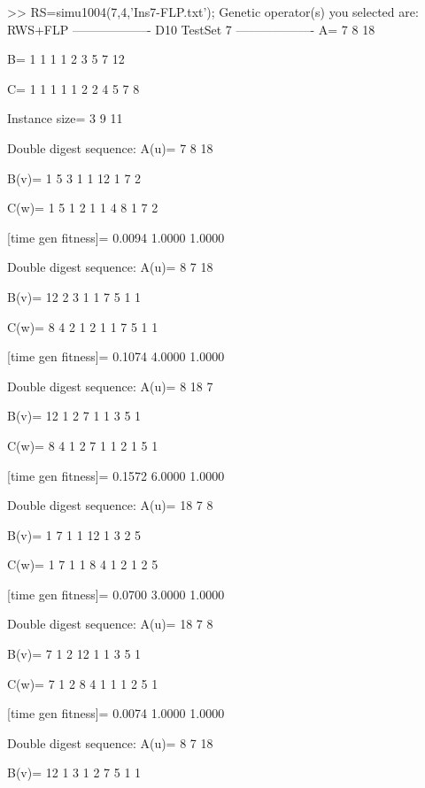 >> RS=simu1004(7,4,'Ins7-FLP.txt');
Genetic operator(s) you selected are:
RWS+FLP
------------------- D10 TestSet 7 -------------------
A=
     7     8    18

B=
     1     1     1     1     2     3     5     7    12

C=
     1     1     1     1     1     2     2     4     5     7     8

Instance size=
     3     9    11

Double digest sequence:
A(u)=
     7     8    18

B(v)=
     1     5     3     1     1    12     1     7     2

C(w)=
     1     5     1     2     1     1     4     8     1     7     2

[time gen fitness]=
    0.0094    1.0000    1.0000

Double digest sequence:
A(u)=
     8     7    18

B(v)=
    12     2     3     1     1     7     5     1     1

C(w)=
     8     4     2     1     2     1     1     7     5     1     1

[time gen fitness]=
    0.1074    4.0000    1.0000

Double digest sequence:
A(u)=
     8    18     7

B(v)=
    12     1     2     7     1     1     3     5     1

C(w)=
     8     4     1     2     7     1     1     2     1     5     1

[time gen fitness]=
    0.1572    6.0000    1.0000

Double digest sequence:
A(u)=
    18     7     8

B(v)=
     1     7     1     1    12     1     3     2     5

C(w)=
     1     7     1     1     8     4     1     2     1     2     5

[time gen fitness]=
    0.0700    3.0000    1.0000

Double digest sequence:
A(u)=
    18     7     8

B(v)=
     7     1     2    12     1     1     3     5     1

C(w)=
     7     1     2     8     4     1     1     1     2     5     1

[time gen fitness]=
    0.0074    1.0000    1.0000

Double digest sequence:
A(u)=
     8     7    18

B(v)=
    12     1     3     1     2     7     5     1     1

